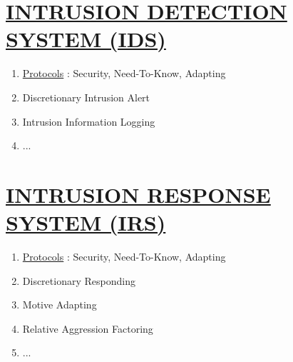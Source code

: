\documentclass[11pt]{article}
\begin{document}
\section*{\ul{INTRUSION DETECTION SYSTEM (IDS)}}
\begin{enumerate}
	\item[] \ul{Protocols} : Security, Need-To-Know, Adapting
	
	\item[] Discretionary Intrusion Alert
	\item[] Intrusion Information Logging
	\item[] ...
	
\end{enumerate}


\section*{\ul{INTRUSION RESPONSE SYSTEM (IRS)}}
\begin{enumerate}
	\item[] \ul{Protocols} : Security, Need-To-Know, Adapting
	
	\item[] Discretionary Responding
	\item[] Motive Adapting
	\item[] Relative Aggression Factoring
	\item[] ...
	
\end{enumerate}
\end{document}
